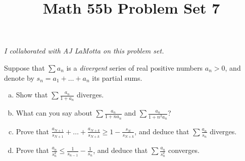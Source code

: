 \documentclass[11pt,letterpaper]{article}
\title{Math 55b Problem Set 7}
\begin{document}
\maketitle

\begin{center}
    \textit{I collaborated with AJ LaMotta on this problem set.}
\end{center}

\begin{problem}
    Suppose that $\sum a_n$ is a {\em divergent} series of real positive numbers $a_n>0$, and denote by $s_n=a_1+\dots+a_n$ its partial sums.
    \begin{enumerate}[(a)]
        \item Show that $\displaystyle \sum \frac{a_n}{1+a_n}$ diverges.
        \item What can you say about $\displaystyle \sum \frac{a_n}{1+na_n}$ and $\displaystyle \sum \frac{a_n}{1+n^2a_n}$?
        \item Prove that $\displaystyle \frac{a_{N+1}}{s_{N+1}}+\dots+\frac{a_{N+k}}{s_{N+k}}\geq 1-\frac{s_N}{s_{N+k}}$, and deduce that $\displaystyle \sum \frac{a_n}{s_n}$ diverges.
        \item Prove that $\displaystyle \frac{a_n}{s_n^2}\leq \frac{1}{s_{n-1}}-\frac{1}{s_n}$, and deduce that $\displaystyle \sum \frac{a_n}{s_n^2}$ converges.
    \end{enumerate}
\end{problem}

\end{document}
